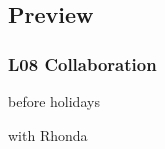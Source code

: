 %
%
%
%
%
%
%
%
%

%

\subsection{Preview}

\begin{frame}
	\frametitle{L08 Collaboration}

	before holidays

	with Rhonda
\end{frame}


%
%	
%	





